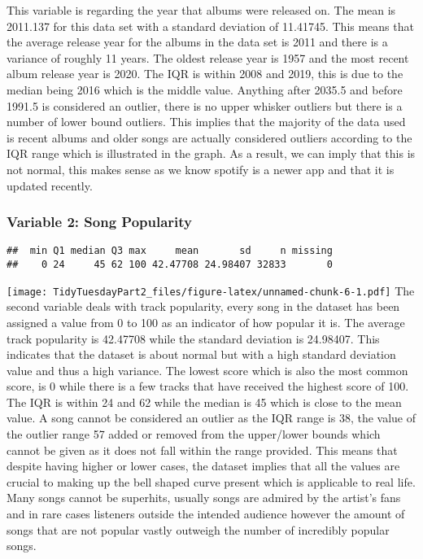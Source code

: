 \documentclass[
]{article}
\newenvironment{Shaded}{\begin{snugshade}}{\end{snugshade}}
\newcommand{\KeywordTok}[1]{\textcolor[rgb]{0.13,0.29,0.53}{\textbf{#1}}}
\newcommand{\NormalTok}[1]{#1}
\newcommand{\OperatorTok}[1]{\textcolor[rgb]{0.81,0.36,0.00}{\textbf{#1}}}
\newcommand{\StringTok}[1]{\textcolor[rgb]{0.31,0.60,0.02}{#1}}
\begin{document}
This variable is regarding the year that albums were released on. The
mean is 2011.137 for this data set with a standard deviation of
11.41745. This means that the average release year for the albums in the
data set is 2011 and there is a variance of roughly 11 years. The oldest
release year is 1957 and the most recent album release year is 2020. The
IQR is within 2008 and 2019, this is due to the median being 2016 which
is the middle value. Anything after 2035.5 and before 1991.5 is
considered an outlier, there is no upper whisker outliers but there is a
number of lower bound outliers. This implies that the majority of the
data used is recent albums and older songs are actually considered
outliers according to the IQR range which is illustrated in the graph.
As a result, we can imply that this is not normal, this makes sense as
we know spotify is a newer app and that it is updated recently.

\hypertarget{variable-2-song-popularity}{%
\subsubsection{Variable 2: Song
Popularity}\label{variable-2-song-popularity}}

\begin{Shaded}
\end{Shaded}

\begin{verbatim}
##  min Q1 median Q3 max     mean       sd     n missing
##    0 24     45 62 100 42.47708 24.98407 32833       0
\end{verbatim}

\texttt{[image: TidyTuesdayPart2\_files/figure-latex/unnamed-chunk-6-1.pdf]}
The second variable deals with track popularity, every song in the
dataset has been assigned a value from 0 to 100 as an indicator of how
popular it is. The average track popularity is 42.47708 while the
standard deviation is 24.98407. This indicates that the dataset is about
normal but with a high standard deviation value and thus a high
variance. The lowest score which is also the most common score, is 0
while there is a few tracks that have received the highest score of 100.
The IQR is within 24 and 62 while the median is 45 which is close to the
mean value. A song cannot be considered an outlier as the IQR range is
38, the value of the outlier range 57 added or removed from the
upper/lower bounds which cannot be given as it does not fall within the
range provided. This means that despite having higher or lower cases,
the dataset implies that all the values are crucial to making up the
bell shaped curve present which is applicable to real life. Many songs
cannot be superhits, usually songs are admired by the artist's fans and
in rare cases listeners outside the intended audience however the amount
of songs that are not popular vastly outweigh the number of incredibly
popular songs.
\end{document}
